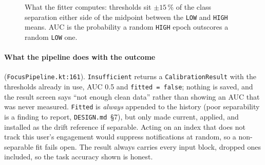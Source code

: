 \documentclass[10pt,a4paper]{article}
\newcommand{\file}[1]{\texttt{\small #1}}          %
\newcommand{\code}[1]{\texttt{#1}}                  %
\newcommand{\Thigh}{T_{\mathrm{high}}}
\newcommand{\Tlow}{T_{\mathrm{low}}}
\begin{document}
\begin{figure}[htbp]\centering
{}
\caption{What the fitter computes: thresholds sit $\pm15\,\%$ of the class separation either side
of the midpoint between the \code{LOW} and \code{HIGH} means. AUC is the probability a random
\code{HIGH} epoch outscores a random \code{LOW} one.}\label{fig:fitter}
\end{figure}

\paragraph{What the pipeline does with the outcome} (\file{FocusPipeline.kt:161}).
\code{Insufficient} returns a \code{CalibrationResult} with the thresholds already in use, AUC
0.5 and \code{fitted = false}; nothing is saved, and the result screen says ``not enough clean
data'' rather than showing an AUC that was never measured. \code{Fitted} is \emph{always} appended
to the history (poor separability is a finding to report, \file{DESIGN.md}~\S7), but only made
current, applied, and installed as the drift reference if separable. Acting on an index that does
not track this user's engagement would suppress notifications at random, so a non-separable fit
fails open. The result always carries every input block, dropped ones included, so the task
accuracy shown is honest.
\end{document}
